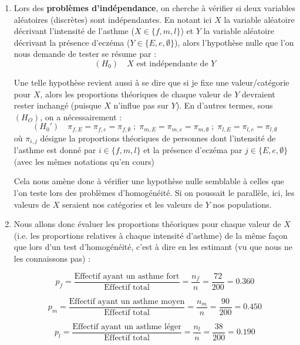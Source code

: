 \documentclass[a4paper,oneside,12pt]{article}
\theoremstyle{plain}
\begin{document}
\begin{enumerate}
    \item Lors des \textbf{problèmes d'indépendance}, on cherche à vérifier si deux variables aléatoires (discrètes) sont indépendantes. En notant ici $X$ la variable aléatoire décrivant l'intensité de l'asthme ($X \in \{f, m, l\}$) et $Y$ la variable aléatoire décrivant la présence d'eczéma ($Y \in \{E, e, \emptyset\}$), alors l'hypothèse nulle que l'on nous demande de tester se résume par :
    $$(H_0) \quad X \mbox{ est indépendante de } Y$$

    Une telle hypothèse revient aussi à se dire que si je fixe une valeur/catégorie pour $X$, alors les proportions théoriques de chaque valeur de $Y$ devraient rester inchangé (puisque $X$ n'influe pas sur $Y$). En d'autres termes, sous $(H_O)$, on a nécessairement  :
    $$(H_0') \quad \pi_{f,E} = \pi_{f,e}= \pi_{f,\emptyset}\; ; \;\pi_{m,E} = \pi_{m,e}= \pi_{m,\emptyset}\; ; \;\pi_{l,E} = \pi_{l,e}= \pi_{l,\emptyset}$$
    où $\pi_{i,j}$ désigne la proportions théoriques de personnes dont l'intensité de l'asthme est donné par $i \in \{f, m, l\}$ et la présence d'eczéma par $j \in \{E, e, \emptyset\} $ (avec les mêmes notations qu'en cours)

    Cela nous amène donc à vérifier une hypothèse nulle semblable à celles que l'on teste lors des problèmes d'homogénéité. Si on poussait le parallèle, ici, les valeurs de $X$ seraient nos catégories et les valeurs de $Y$ nos populations. 
    
    \item Nous allons donc évaluer les proportions théoriques pour chaque valeur de $X$ (i.e. les proportions relatives à chaque intensité d'asthme) de la même façon que lors d'un test d'homogénéité, c'est à dire en les estimant (vu que nous ne les connaissons pas) :

    $$p_{f} = \frac{\mbox{Effectif ayant un asthme fort}}{\mbox{Effectif total}} = \frac{n_f}{n} = \frac{72}{200} = 0.360$$

    $$p_{m} = \frac{\mbox{Effectif ayant un asthme moyen}}{\mbox{Effectif total}} = \frac{n_m}{n} = \frac{90}{200} = 0.450$$

    $$p_{l} = \frac{\mbox{Effectif ayant un asthme léger}}{\mbox{Effectif total}} = \frac{n_l}{n} = \frac{38}{200} = 0.190$$


\end{enumerate}
\end{document}
